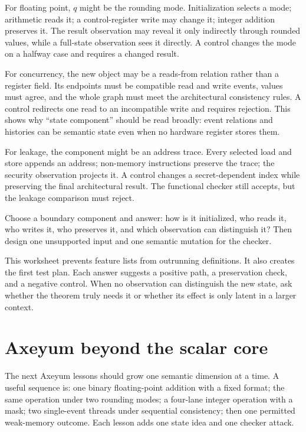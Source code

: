For floating point, \(q\) might be the rounding mode. Initialization selects
a mode; arithmetic reads it; a control-register write may change it; integer
addition preserves it. The result observation may reveal it only indirectly
through rounded values, while a full-state observation sees it directly. A
control changes the mode on a halfway case and requires a changed result.

For concurrency, the new object may be a reads-from relation rather than a
register field. Its endpoints must be compatible read and write events, values
must agree, and the whole graph must meet the architectural consistency rules.
A control redirects one read to an incompatible write and requires rejection.
This shows why ``state component'' should be read broadly: event relations and
histories can be semantic state even when no hardware register stores them.

For leakage, the component might be an address trace. Every selected load and
store appends an address; non-memory instructions preserve the trace; the
security observation projects it. A control changes a secret-dependent index
while preserving the final architectural result. The functional checker still
accepts, but the leakage comparison must reject.

\begin{tryit}[title={Write the five questions before the semantics}]
Choose a boundary component and answer: how is it initialized, who reads it,
who writes it, who preserves it, and which observation can distinguish it?
Then design one unsupported input and one semantic mutation for the checker.
\end{tryit}

This worksheet prevents feature lists from outrunning definitions. It also
creates the first test plan. Each answer suggests a positive path, a
preservation check, and a negative control. When no observation can distinguish
the new state, ask whether the theorem truly needs it or whether its effect is
only latent in a larger context.

\section{Axeyum beyond the scalar core}

The next Axeyum lessons should grow one semantic dimension at a time. A useful
sequence is: one binary floating-point addition with a fixed format; the same
operation under two rounding modes; a four-lane integer operation with a mask;
two single-event threads under sequential consistency; then one permitted
weak-memory outcome. Each lesson adds one state idea and one checker attack.

